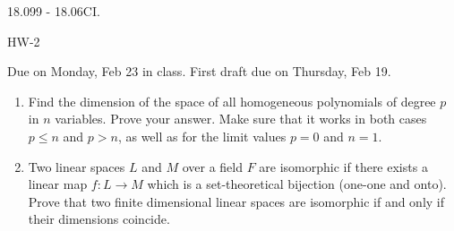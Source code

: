 \documentclass[11pt]{amsart}
\begin{document}
\thispagestyle{empty}

{\Large  18.099 - 18.06CI.} 

\vspace{1cm} 
{\large HW-2} 
 

{Due on Monday, Feb 23 in class. 
First draft due on Thursday, Feb 19}.

\vspace{1cm}
 

\begin{enumerate}

\item{Find the dimension of the space of all homogeneous polynomials 
of degree $p$ in $n$ variables. Prove your answer. 
Make sure that it works in both cases $p \leq n$ and $p > n$, as 
well as for the limit values $p=0$ and $n=1$.}

\item{Two linear spaces $L$ and $M$ over a field $F$ are isomorphic 
if there exists a linear map $f : L \to M$ which is a set-theoretical 
bijection (one-one and onto). Prove that two finite dimensional linear 
spaces are isomorphic if and only if their dimensions coincide. } 


\end{enumerate} 
\end{document}
